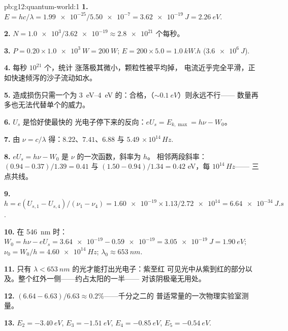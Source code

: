 \begin{solution}{pb:g12:quantum-world:1}
\textbf{1.} $E = hc/\lambda = \num{1.99e-25}/\num{5.50e-7} =
\qty{3.62e-19}{J} = \qty{2.26}{eV}$.

\textbf{2.} $N = \num{1.0e3}/\num{3.62e-19} \approx \num{2.8e21}$
个每秒。

\textbf{3.} $P = 0.20 \times \qty{1.0e3}{W} = \qty{200}{W}$;
$E = 200 \times 5.0 = \qty{1.0}{kW.h}$ ($\qty{3.6e6}{J}$).

\textbf{4.} 每秒 $10^{21}$ 个，统计
涨落极其微小，颗粒性被平均掉，
电流近乎完全平滑，正如快速倾泻的沙子流动如水。

\textbf{5.} 造成损伤只需一个为 \qtyrange{3}{4}{eV} 的：合格，（$\sim \qty{0.1}{eV}$）则永远不行——
数量再多也无法代替单个的威力。

\textbf{6.} $U_s$ 是恰好使最快的
光电子停下来的反向：$eU_s = E_{k,\max} = h\nu - W_0$。

\textbf{7.} 由 $\nu = c/\lambda$ 得：$8.22$、$7.41$、$6.88$ 与 $5.49$
$\times\,10^{14}\,\unit{Hz}$.

\textbf{8.} $eU_s = h\nu - W_0$ 是 $\nu$ 的一次函数，斜率为 $h$。
相邻两段斜率：$(0.94 - 0.37)/1.39 = 0.41$ 与
$(1.50 - 0.94)/1.34 = 0.42$ \unit{eV}，每 $10^{14}\,\unit{Hz}$——
三点共线。

\textbf{9.} $h = e(U_{s,1}-U_{s,4})/(\nu_1-\nu_4) = \num{1.60e-19}
\times 1.13/\num{2.72e14} = \qty{6.64e-34}{J.s}$.

\textbf{10.} 在 \qty{546}{nm} 时：$W_0 = h\nu - eU_s = \num{3.64e-19} -
\num{0.59e-19} = \qty{3.05e-19}{J} = \qty{1.90}{eV}$;
$\nu_0 = W_0/h = \qty{4.60e14}{Hz}$; $\lambda_0 \approx \qty{653}{nm}$.

\textbf{11.} 只有 $\lambda < \qty{653}{nm}$ 的光才能打出光电子：紫至红
可见光中从紫到红的部分以及。整个红外一侧——约占太阳的一半——
对该阴极毫无用处。

\textbf{12.} $(6.64 - 6.63)/6.63 \approx 0.2\%$——千分之二的
普适常量的一次物理实验室测量。

\textbf{13.} $E_2 = \qty{-3.40}{eV}$, $E_3 = \qty{-1.51}{eV}$,
$E_4 = \qty{-0.85}{eV}$, $E_5 = \qty{-0.54}{eV}$.


\end{solution}
